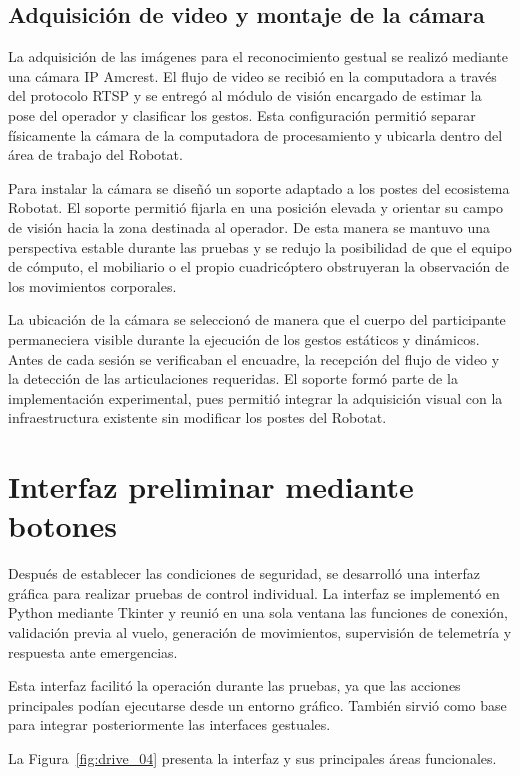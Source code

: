 \subsection{Adquisición de video y montaje de la cámara}

La adquisición de las imágenes para el reconocimiento gestual se realizó mediante una cámara IP Amcrest. El flujo de video se recibió en la computadora a través del protocolo RTSP y se entregó al módulo de visión encargado de estimar la pose del operador y clasificar los gestos. Esta configuración permitió separar físicamente la cámara de la computadora de procesamiento y ubicarla dentro del área de trabajo del Robotat.

Para instalar la cámara se diseñó un soporte adaptado a los postes del ecosistema Robotat. El soporte permitió fijarla en una posición elevada y orientar su campo de visión hacia la zona destinada al operador. De esta manera se mantuvo una perspectiva estable durante las pruebas y se redujo la posibilidad de que el equipo de cómputo, el mobiliario o el propio cuadricóptero obstruyeran la observación de los movimientos corporales.

La ubicación de la cámara se seleccionó de manera que el cuerpo del participante permaneciera visible durante la ejecución de los gestos estáticos y dinámicos. Antes de cada sesión se verificaban el encuadre, la recepción del flujo de video y la detección de las articulaciones requeridas. El soporte formó parte de la implementación experimental, pues permitió integrar la adquisición visual con la infraestructura existente sin modificar los postes del Robotat.

\section{Interfaz preliminar mediante botones}

Después de establecer las condiciones de seguridad, se desarrolló una interfaz gráfica para realizar pruebas de control individual. La interfaz se implementó en Python mediante Tkinter y reunió en una sola ventana las funciones de conexión, validación previa al vuelo, generación de movimientos, supervisión de telemetría y respuesta ante emergencias.

Esta interfaz facilitó la operación durante las pruebas, ya que las acciones principales podían ejecutarse desde un entorno gráfico. También sirvió como base para integrar posteriormente las interfaces gestuales.

La Figura~\ref{fig:drive_04} presenta la interfaz y sus principales áreas funcionales.

